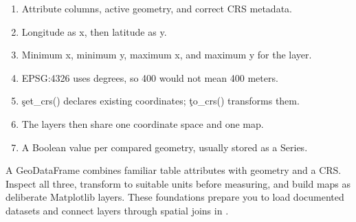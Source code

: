 
\begin{enumerate}
    \item Attribute columns, active geometry, and correct CRS metadata.
    \item Longitude as x, then latitude as y.
    \item Minimum x, minimum y, maximum x, and maximum y for the layer.
    \item EPSG:4326 uses degrees, so 400 would not mean 400 meters.
    \item \c{set_crs()} declares existing coordinates; \c{to_crs()} transforms them.
    \item The layers then share one coordinate space and one map.
    \item A Boolean value per compared geometry, usually stored as a Series.
\end{enumerate}

\begin{tcolorbox}[title=Chapter summary,colframe=orange,colback=white,arc=2mm]
A GeoDataFrame combines familiar table attributes with geometry and a CRS.
Inspect all three, transform to suitable units before measuring, and build maps
as deliberate Matplotlib layers. These foundations prepare you to load
documented datasets and connect layers through spatial joins in
.
\end{tcolorbox}
